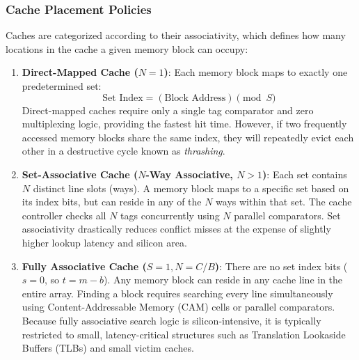 \subsubsection{Cache Placement Policies}
Caches are categorized according to their associativity, which defines how many locations in the cache a given memory block can occupy:
\begin{enumerate}
    \item \textbf{Direct-Mapped Cache ($N = 1$)}: Each memory block maps to exactly one predetermined set:
    \[
    \text{Set Index} = (\text{Block Address}) \pmod S
    \]
    Direct-mapped caches require only a single tag comparator and zero multiplexing logic, providing the fastest hit time. However, if two frequently accessed memory blocks share the same index, they will repeatedly evict each other in a destructive cycle known as \textit{thrashing}.
    
    \item \textbf{Set-Associative Cache ($N$-Way Associative, $N > 1$)}: Each set contains $N$ distinct line slots (ways). A memory block maps to a specific set based on its index bits, but can reside in any of the $N$ ways within that set. The cache controller checks all $N$ tags concurrently using $N$ parallel comparators. Set associativity drastically reduces conflict misses at the expense of slightly higher lookup latency and silicon area.
    
    \item \textbf{Fully Associative Cache ($S = 1, N = C/B$)}: There are no set index bits ($s = 0$, so $t = m - b$). Any memory block can reside in any cache line in the entire array. Finding a block requires searching every line simultaneously using Content-Addressable Memory (CAM) cells or parallel comparators. Because fully associative search logic is silicon-intensive, it is typically restricted to small, latency-critical structures such as Translation Lookaside Buffers (TLBs) and small victim caches.
\end{enumerate}


